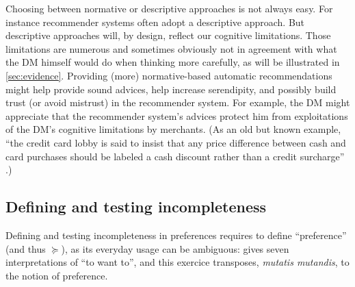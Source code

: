 \documentclass[french, english]{llncs}
\begin{document}
Choosing between normative or descriptive approaches is not always easy. For instance recommender systems often adopt a descriptive approach. 
But descriptive approaches will, by design, reflect our cognitive limitations. Those limitations are numerous and sometimes obviously not in agreement with what the \ac{DM} himself would do when thinking more carefully, as will be illustrated in \cref{sec:evidence}. 
Providing (more) normative-based automatic recommendations might help provide sound advices, help increase serendipity, and possibly build trust (or avoid mistrust) in the recommender system. For example, the \ac{DM} might appreciate that the recommender system’s advices protect him from exploitations of the \ac{DM}’s cognitive limitations by merchants. (As an old but known example, “the credit card lobby is said to insist that any price difference between cash and card purchases should be labeled a cash discount rather than a credit surcharge” \citep{tversky_rational_1986}.) 
	
\subsection{Defining and testing incompleteness}
\label{sec:empirical}
Defining and testing incompleteness in preferences requires to define “preference” (and thus $\succeq$), as its everyday usage can be ambiguous: \citet{frankfurt_freedom_1971} gives seven interpretations of “to want to”, and this exercice transposes, \emph{mutatis mutandis}, to the notion of preference.
	
	
\end{document}
